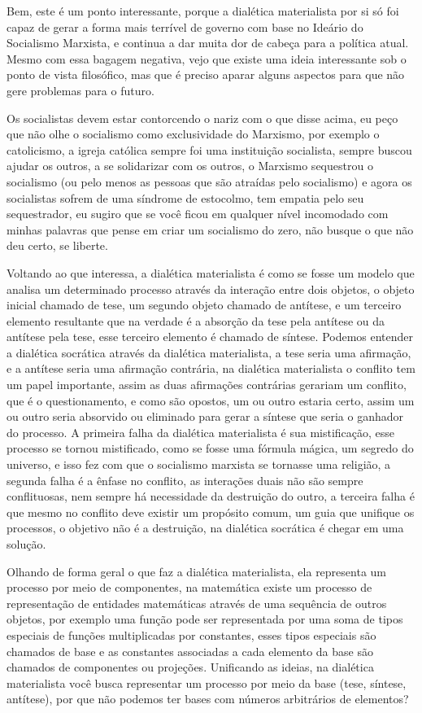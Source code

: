 Bem, este é um ponto interessante, porque a dialética materialista por si só foi capaz de gerar a forma mais terrível de governo com base no Ideário do Socialismo Marxista, e continua a dar muita dor de cabeça para a política atual. Mesmo com essa bagagem negativa, vejo que existe uma ideia interessante sob o ponto de vista filosófico, mas que é preciso aparar alguns aspectos para que não gere problemas para o futuro. 

Os socialistas devem estar contorcendo o nariz com o que disse acima, eu peço que não olhe o socialismo como exclusividade do Marxismo, por exemplo o catolicismo, a igreja católica sempre foi uma instituição socialista, sempre buscou ajudar os outros, a se solidarizar com os outros, o Marxismo sequestrou o socialismo (ou pelo menos as pessoas que são atraídas pelo socialismo) e agora os socialistas sofrem de uma síndrome de estocolmo, tem empatia pelo seu sequestrador, eu sugiro que se você ficou em qualquer nível incomodado com minhas palavras que pense em criar um socialismo do zero, não busque o que não deu certo, se liberte.

Voltando ao que interessa, a dialética materialista é como se fosse um modelo que analisa um determinado processo através da interação entre dois objetos, o objeto inicial chamado de tese, um segundo objeto chamado de antítese, e um terceiro elemento resultante que na verdade é a absorção da tese pela antítese ou da antítese pela tese, esse terceiro elemento é chamado de síntese. Podemos entender a dialética socrática através da dialética materialista, a tese seria uma afirmação, e a antítese seria uma afirmação contrária, na dialética materialista o conflito tem um papel importante, assim as duas afirmações contrárias gerariam um conflito, que é o questionamento, e como são opostos, um ou outro estaria certo, assim um ou outro seria absorvido ou eliminado para gerar a síntese que seria o ganhador do processo. A primeira falha da dialética materialista é sua mistificação, esse processo se tornou mistificado, como se fosse uma fórmula mágica, um segredo do universo, e isso fez com que o socialismo marxista se tornasse uma religião, a segunda falha é a ênfase no conflito, as interações duais não são sempre conflituosas, nem sempre há necessidade da destruição do outro, a terceira falha é que mesmo no conflito deve existir um propósito comum, um guia que unifique os processos, o objetivo não é a destruição, na dialética socrática é chegar em uma solução.

Olhando de forma geral o que faz a dialética materialista, ela representa um processo por meio de componentes, na matemática existe um processo de representação de entidades matemáticas através de uma sequência de outros objetos, por exemplo uma função pode ser representada por uma soma de tipos especiais de funções multiplicadas por constantes, esses tipos especiais são chamados de base e as constantes associadas a cada elemento da base são chamados de componentes ou projeções. Unificando as ideias, na dialética materialista você busca representar um processo por meio da base (tese, síntese, antítese), por que não podemos ter bases com números arbitrários de elementos?\\

